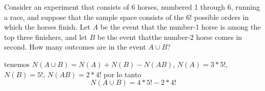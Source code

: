 \item Consider an experiment that consists of 6 horses, numbered 1 through 6, running a race, and suppose that the sample space consists of the 6! possible orders in which the horses finish. Let $A$ be the event that the number-1 horse is among the top three finishers, and let $B$ be the event thatthe number-2 horse comes in second. How many outcomes are in the event $A \cup B$?

tenemos $N(A \cup B) = N(A) + N(B) - N(AB)$, $N(A) = 3 * 5!$, $N(B) = 5!$, $N(AB) = 2 * 4!$ por lo tanto
\[ N(A\cup B) = 4 * 5! - 2 * 4! \]